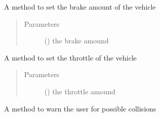 \documentclass[letterpaper,10pt,english]{sphinxmanual}
\begin{document}
\begin{fulllineitems}
\begin{fulllineitems}
\label{\detokenize{driver:lib.driver.Driver.set_brake}}
A method to set the brake amount of the vehicle
\begin{quote}\begin{description}
\item[{Parameters}] \leavevmode
{} () \textendash{} the brake amound

\end{description}\end{quote}

\end{fulllineitems}


\begin{fulllineitems}
\label{\detokenize{driver:lib.driver.Driver.set_throttle}}
A method to set the throttle of the vehicle
\begin{quote}\begin{description}
\item[{Parameters}] \leavevmode
{} () \textendash{} the throttle amound

\end{description}\end{quote}

\end{fulllineitems}


\begin{fulllineitems}
\label{\detokenize{driver:lib.driver.Driver.warn}}
A method to warn the user for possible collisions

\end{fulllineitems}


\end{fulllineitems}
\end{document}

